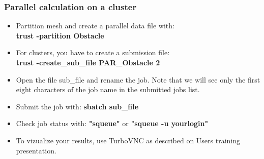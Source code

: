 \documentclass[10pt, hyperref={unicode=true,pdfusetitle, bookmarks=true,bookmarksnumbered=false,bookmarksopen=false, breaklinks=false,pdfborder={0 0 1},backref=true,colorlinks=true,linkcolor=darkblue,pageanchor}]{beamer}
\begin{document}
\begin{frame}
\frametitle{Parallel calculation on a cluster}
\begin{block}{}

\begin{itemize}
\item Partition mesh and create a parallel data file with:\\
\textbf{trust -partition Obstacle}

\item For clusters, you have to create a submission file:\\
\textbf{trust -create\_sub\_file PAR\_Obstacle 2}

\item Open the file sub\_file and rename the job. Note that we will see only the first eight characters of the job name in the submitted jobs list.

\item Submit the job with: 
\textbf{sbatch sub\_file}

\item Check job status with: \textbf{"squeue"} or \textbf{"squeue -u yourlogin"}

\item To vizualize your results, use TurboVNC as described on Users training presentation.


\end{itemize}

\end{block}
\end{frame}
\end{document}
